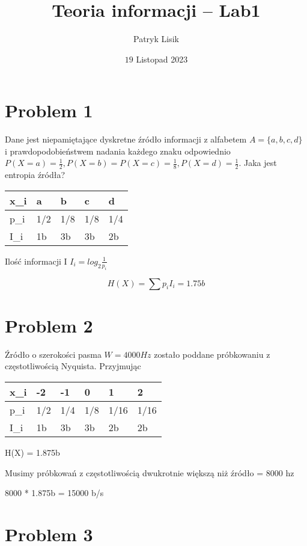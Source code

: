 \documentclass[12pt]{article}
\title{Teoria informacji -- Lab1}
\author{Patryk Lisik}
\date{\(19\) Listopad  2023}
\begin{document}
\maketitle


\section*{Problem 1}

Dane jest niepamiętające dyskretne źródło informacji z alfabetem $A = \{a,b,c,d\}$ i prawdopodobieństwem 
nadania każdego znaku odpowiednio $P(X=a)=\frac{1}{2}, P(X=b)=P(X=c)=\frac{1}{8}, P(X=d) = \frac{1}{2}$. 
Jaka jest entropia źródła?

\begin{table}[h]
\begin{tabular}{|l|l|l|l|l|}
\hline
x\_i & a   & b   & c   & d   \\ \hline
p\_i & 1/2 & 1/8 & 1/8 & 1/4 \\ \hline
I\_i & 1b  & 3b  & 3b  & 2b  \\ \hline
\end{tabular}

\end{table}
Ilość informacji I
$I_i = log_2\frac{1}{p_i} $

$$H(X) = \sum p_iI_i = 1.75b $$

\section*{Problem 2}
Źródło o szerokości pasma $W = 4000Hz$ zostało poddane próbkowaniu z częstotliwością Nyquista.
Przyjmując 


\begin{table}[h]
\begin{tabular}{|l|l|l|l|l|l|}
\hline
    x\_i & -2   & -1   & 0   & 1 & 2   \\ \hline
    p\_i & 1/2 & 1/4 & 1/8 & 1/16 & 1/16 \\ \hline
    I\_i & 1b  & 3b  & 3b  & 2b & 2b \\ \hline
\end{tabular}

\end{table}

H(X) = 1.875b

Musimy próbkowań z częstotliwością dwukrotnie większą niż źródło = 8000 hz

8000 * 1.875b = 15000 b/s

\section*{Problem 3}
\end{document}
